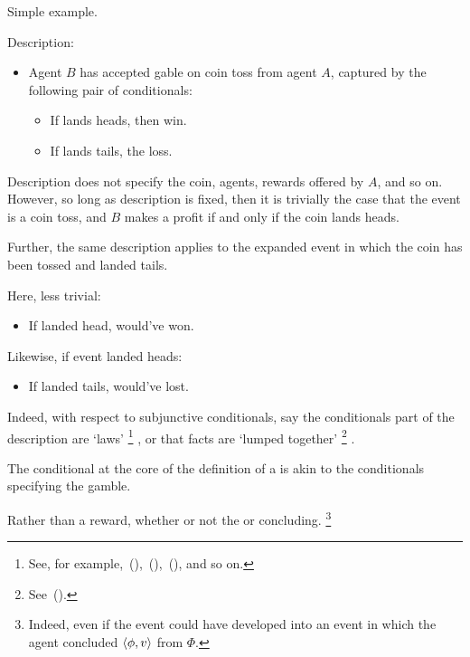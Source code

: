 \begin{note}
  Simple example.

  Description:

  \begin{itemize}
  \item
    Agent \(B\) has accepted gable on coin toss from agent \(A\), captured by the following pair of conditionals:
    \begin{itemize}
    \item
      If lands heads, then win.
    \item
      If lands tails, the loss.
    \end{itemize}
  \end{itemize}

  Description does not specify the coin, agents, rewards offered by \(A\), and so on.
  However, so long as description is fixed, then it is trivially the case that the event is a coin toss, and \(B\) makes a profit if and only if the coin lands heads.

  Further, the same description applies to the expanded event in which the coin has been tossed and landed tails.

  Here, less trivial:
  \begin{itemize}
  \item
    If landed head, would've won.
  \end{itemize}
  Likewise, if event landed heads:
  \begin{itemize}
  \item
    If landed tails, would've lost.
  \end{itemize}

  Indeed, with respect to subjunctive conditionals, say the conditionals part of the description are `laws'%
  \footnote{%
    \nocite{Tichy:1976tp}%
    See, for example,~(\cite{Chisholm:1955aa}),~(\cite{Lewis:1979vm}),~(\cite{Veltman:2005tj}), and so on.
  }%
  , or that facts are `lumped together'%
  \footnote{
    See~(\cite{Kratzer:1981aa,Kratzer:1989aa}).
  }%
  .
\end{note}

\begin{note}
  The conditional at the core of the definition of a \requ{} is akin to the conditionals specifying the gamble.

  Rather than a reward, whether or not the \fc{} or concluding.%
  \footnote{
    Indeed, even if the event could have developed into an event in which the agent concluded \(\langle \phi, v \rangle\) from \(\Phi\).
  }
\end{note}

